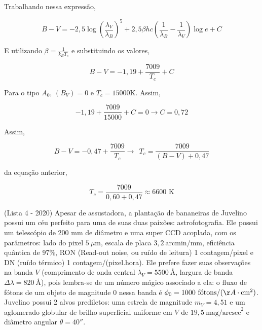 \documentclass[11pt]{article}
\begin{document}
\begin{pproblem}
\begin{pssolution*}{}{}
\begin{alternativas}
        Trabalhando nessa expressão, 

        \[B-V = -2,5\log\left(\frac{\lambda_V}{\lambda_B}\right)^5 + 2,5 \beta hc\left(\frac{1}{\lambda_B}-\frac{1}{\lambda_V}\right)\log e + C\]

        E utilizando \(\beta = \frac{1}{k_B T_c}\) e substituindo os valores, 

        \[B-V = -1,19 + \frac{7009}{T_c}+C\]

        Para o tipo \(A_0\), \((B_V)=0\) e \(T_c = 15000\)K. Assim, 

        \[-1,19 + \frac{7009}{15000} + C = 0 \rightarrow C = 0,72\]

        Assim, 

        \[B-V = -0,47 + \frac{7009}{T_c} \rightarrow \ \ \boxed{T_c = \frac{7009}{(B-V) + 0,47}}\]

        \item da equação anterior, 
        
        \[\boxed{T_c = \frac{7009}{0,60 + 0,47} \approx 6600 \text{ K}}\]
    \end{alternativas}    

\end{pssolution*}
\end{pproblem}


\begin{pproblem}
    (Lista 4 - 2020) Apesar de assustadora, a plantação de bananeiras de Juvelino possui um céu perfeito para uma de suas duas paixões: astrofotografia. Ele possui um telescópio de 200 mm de diâmetro e uma super CCD acoplada, com os parâmetros: lado do pixel \(5\ \mu\text{m}\), escala de placa \(3,2\ \text{arcmin/mm}\), eficiência quântica de 97\%, RON (Read-out noise, ou ruído de leitura) 1 contagem/pixel e DN (ruído térmico) 1 contagem/(pixel.hora). Ele prefere fazer suas observações na banda \(V\) (comprimento de onda central \(\lambda_V = 5500\ \text{Å}\), largura de banda \(\Delta \lambda = 820\ \text{Å}\)), pois lembra-se de um número mágico associado a ela: o fluxo de fótons de um objeto de magnitude 0 nessa banda é \(\phi_0 = 1000\ \text{fótons/}(\AA\cdot \text{cm}^2)\). Juvelino possui 2 alvos prediletos: uma estrela de magnitude \(m_V = 4,51\) e um aglomerado globular de brilho superficial uniforme em \(V\) de \(19,5\ \text{mag/arcsec}^2\) e diâmetro angular \(\theta = 40''\).
\end{pproblem}
\end{document}
